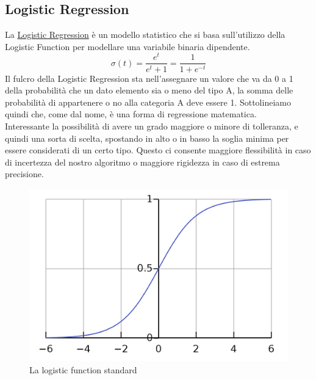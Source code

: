 \subsection{Logistic Regression}
La \href{https://en.wikipedia.org/wiki/Logistic_regression}{Logistic Regression}  è un modello statistico che si basa sull'utilizzo della Logistic Function per modellare una variabile binaria dipendente.
\begin{equation}
\sigma (t)={\frac {e^{t}}{e^{t}+1}}={\frac {1}{1+e^{-t}}}
\end{equation}
Il fulcro della Logistic Regression sta nell'assegnare un valore che va da 0 a 1 della probabilità che un dato elemento sia o meno del tipo A, la somma delle probabilità di appartenere o no alla categoria A deve essere 1. Sottolineiamo quindi che, come dal nome, è una forma di regressione matematica.\\ Interessante la possibilità di avere un grado maggiore o minore di tolleranza, e quindi una sorta di scelta, spostando in alto o in basso la soglia minima per essere considerati di un certo tipo. Questo ci consente maggiore flessibilità in caso di incertezza del nostro algoritmo o maggiore rigidezza in caso di estrema precisione.
\begin{figure}[H]
\centering
\includegraphics[scale=0.25]{img/logisticFunction.png}
\caption{La logistic function standard}
\end{figure}

